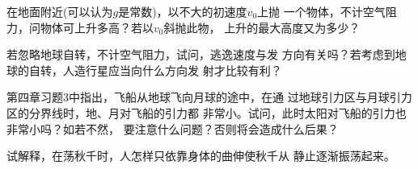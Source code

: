 \begin{questions}
  \question 在地面附近(可以认为$ g $是常数)，以不大的初速度$ v_0 $上抛
  一个物体，不计空气阻力，问物体可上升多高？若以$ v _ { 0 } $斜抛此物，
  上升的最大高度又为多少？

  \question 若忽略地球自转，不计空气阻力，试问，逃逸速度与发
  方向有关吗？若考虑到地球的自转，人造行星应当向什么方向发
  射才比较有利？

  \question 第四章习题3中指出，飞船从地球飞向月球的途中，在通
  过地球引力区与月球引力区的分界线时，地、月对飞船的引力都
  非常小。试问，此时太阳对飞船的引力也非常小吗？如若不然，
  要注意什么问题？否则将会造成什么后果？

  \question 试解释，在荡秋千时，人怎样只依靠身体的曲伸使秋千从
  静止逐渐振荡起来。

\end{questions}
